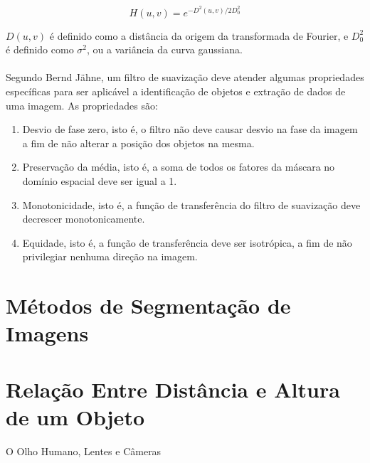 \[
H(u,v) = e^{-D^{2}(u,v)/2D^{2}_{0}}
\]

\noindent\(D(u,v)\) é definido como a distância da origem da transformada de Fourier, e \(D^{2}_{0}\) é definido como \(\sigma^{2}\), ou a variância da curva gaussiana.

\paragraph{}Segundo Bernd Jähne\cite{Jahne02}, um filtro de suavização deve atender algumas propriedades específicas para ser aplicável a identificação de objetos e extração de dados de uma imagem. As propriedades são:

\begin{enumerate}

\item Desvio de fase zero, isto é, o filtro não deve causar desvio na fase da imagem a fim de não alterar a posição dos objetos na mesma.

\item Preservação da média, isto é, a soma de todos os fatores da máscara no domínio espacial deve ser igual a 1.

\item Monotonicidade, isto é, a função de transferência do filtro de suavização deve decrescer monotonicamente.

\item Equidade, isto é, a função de transferência deve ser isotrópica, a fim de não privilegiar nenhuma direção na imagem.

\end{enumerate}

\section{Métodos de Segmentação de Imagens}

\section{Relação Entre Distância e Altura de um Objeto}

O Olho Humano, Lentes e Câmeras




































